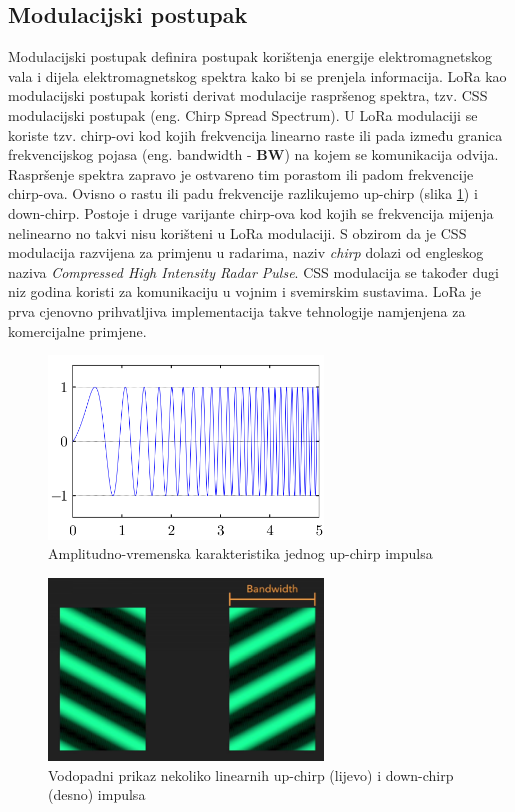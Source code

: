 \subsection{Modulacijski postupak}
\label{subsection:lora_modulation}
Modulacijski postupak definira postupak korištenja energije elektromagnetskog vala i dijela elektromagnetskog spektra kako bi se prenjela informacija.\newline
LoRa kao modulacijski postupak koristi derivat modulacije raspršenog spektra, tzv. CSS modulacijski postupak (eng. Chirp Spread Spectrum). U LoRa modulaciji se koriste tzv. chirp-ovi kod kojih frekvencija linearno raste ili pada između granica frekvencijskog pojasa (eng. bandwidth - \textbf{BW}) na kojem se komunikacija odvija. Raspršenje spektra zapravo je ostvareno tim porastom ili padom frekvencije chirp-ova. Ovisno o rastu ili padu frekvencije razlikujemo up-chirp (slika \ref{img:up_chirp}) i down-chirp. Postoje i druge varijante chirp-ova kod kojih se frekvencija mijenja nelinearno no takvi nisu korišteni u LoRa modulaciji. S obzirom da je CSS modulacija razvijena za primjenu u radarima, naziv \textit{chirp} dolazi od engleskog naziva \textit{Compressed High Intensity Radar Pulse}. CSS modulacija se također dugi niz godina koristi za komunikaciju u vojnim i svemirskim sustavima. LoRa je prva cjenovno prihvatljiva implementacija takve tehnologije namjenjena za komercijalne primjene.
\begin{figure}[ht!]
	\centering
	\includegraphics[width=0.65\textwidth]{images/linear_chirp.png}
	\caption{Amplitudno-vremenska karakteristika jednog up-chirp impulsa}
	\label{img:up_chirp}
\end{figure}
\begin{figure}[ht!]
	\centering
	\includegraphics[width=0.65\textwidth]{images/chirps.png}
	\caption{Vodopadni prikaz nekoliko linearnih up-chirp (lijevo) i down-chirp (desno) impulsa }
	\label{img:chirps}
\end{figure}


